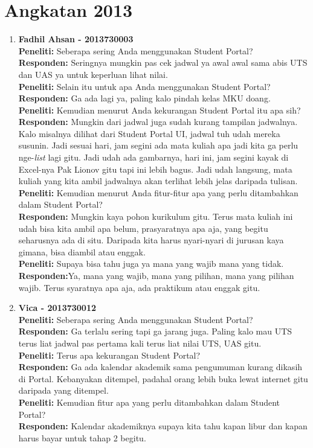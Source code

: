 \section{Angkatan 2013}
\begin{enumerate}

	\item\textbf{Fadhil Ahsan - 2013730003}\\
	\textbf{Peneliti:} Seberapa sering Anda menggunakan Student Portal?\\
	\textbf{Responden:} Seringnya mungkin pas cek jadwal ya awal awal sama abis UTS dan UAS ya untuk keperluan lihat nilai.\\
	\textbf{Peneliti:} Selain itu untuk apa Anda menggunakan Student Portal?\\
	\textbf{Responden:} Ga ada lagi ya, paling kalo pindah kelas MKU doang.\\
	\textbf{Peneliti:} Kemudian menurut Anda kekurangan Student Portal itu apa sih?\\
	\textbf{Responden:} Mungkin dari jadwal juga sudah kurang tampilan jadwalnya. Kalo misalnya dilihat dari Student Portal UI, jadwal tuh udah mereka susunin. Jadi sesuai hari, jam segini ada mata kuliah apa jadi kita ga perlu nge-\textit{list} lagi gitu. Jadi udah ada gambarnya, hari ini, jam segini kayak di Excel-nya Pak Lionov gitu tapi ini lebih bagus. Jadi udah langsung, mata kuliah yang kita ambil jadwalnya akan terlihat lebih jelas daripada tulisan.\\
	\textbf{Peneliti:} Kemudian menurut Anda fitur-fitur apa yang perlu ditambahkan dalam Student Portal?\\
	\textbf{Responden:} Mungkin kaya pohon kurikulum gitu. Terus mata kuliah ini udah bisa kita ambil apa belum, prasyaratnya apa aja, yang begitu seharusnya ada di situ. Daripada kita harus nyari-nyari di jurusan kaya gimana, bisa diambil atau enggak.\\
	\textbf{Peneliti:} Supaya bisa tahu juga ya mana yang wajib mana yang tidak.\\
	\textbf{Responden:}Ya, mana yang wajib, mana yang pilihan, mana yang pilihan wajib. Terus syaratnya apa aja, ada praktikum atau enggak gitu.\\
	
	\item\textbf{Vica - 2013730012}\\
	\textbf{Peneliti:} Seberapa sering Anda menggunakan Student Portal?\\
	\textbf{Responden:} Ga terlalu sering tapi ga jarang juga. Paling kalo mau UTS terus liat jadwal pas pertama kali terus liat nilai UTS, UAS gitu.\\
	\textbf{Peneliti:} Terus apa kekurangan Student Portal?\\
	\textbf{Responden:} Ga ada kalendar akademik sama pengumuman kurang dikasih di Portal. Kebanyakan ditempel, padahal orang lebih buka lewat internet gitu daripada yang ditempel.\\
	\textbf{Peneliti:} Kemudian fitur apa yang perlu ditambahkan dalam Student Portal?\\
	\textbf{Responden:} Kalendar akademiknya supaya kita tahu kapan libur dan kapan harus bayar untuk tahap 2 begitu.\\


\end{enumerate}
